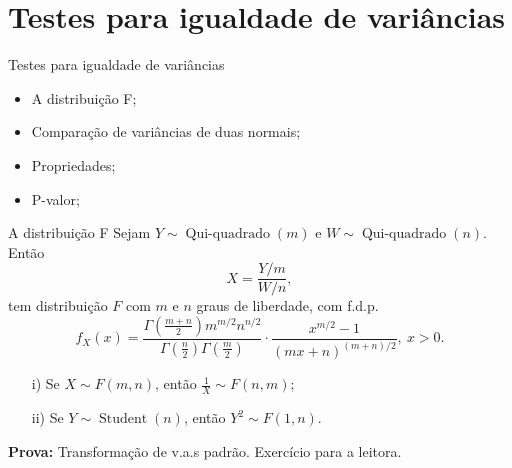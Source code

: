 \section{Testes para igualdade de variâncias}
\begin{frame}{Testes para igualdade de variâncias}
 \begin{itemize}
   \item A distribuição F;
   \item Comparação de variâncias de duas normais;
   \item Propriedades; 
   \item P-valor;
   \end{itemize}
\end{frame}


 \begin{frame}{A distribuição F}
  Sejam $Y \sim\operatorname{Qui-quadrado}(m)$ e $W \sim\operatorname{Qui-quadrado}(n)$.
  Então 
  \begin{equation*}
   X = \frac{Y/m}{W/n},
  \end{equation*}
tem distribuição $F$ com $m$ e $n$ graus de liberdade, com f.d.p.
\begin{equation*}
 f_X(x) = \frac{\Gamma\left(\frac{m + n}{2}\right)m^{m/2} n^{n/2}}{\Gamma\left(\frac{n}{2}\right)\Gamma\left(\frac{m}{2}\right)} \cdot \frac{x^{m/2}-1}{(mx + n)^{(m + n)/2}}, \: x > 0.
\end{equation*}
\begin{theo}
\label{thm:F_distribution_properties}
 \begin{itemize}
  \item[i)] Se $X \sim F(m, n)$, então $\frac{1}{X} \sim F(n, m)$;
  \item[ii)] Se $Y \sim\operatorname{Student}(n)$, então $Y^2 \sim F(1, n)$.
 \end{itemize}
\end{theo}
\textbf{Prova:} Transformação de v.a.s padrão.
Exercício para a leitora.
 \end{frame}

